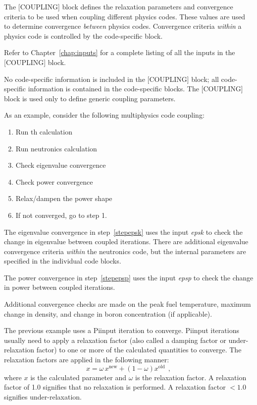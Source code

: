 The [COUPLING] block defines the relaxation parameters and convergence criteria to be
used when coupling different physics codes. These values are used to determine
convergence {\it between} physics codes. Convergence criteria {\it within} a physics
code is controlled by the code-specific block.

Refer to Chapter~\ref{chap:inputs} for a complete listing of all the inputs in the [COUPLING] block.

No code-specific information is included in the [COUPLING] block; all code-specific information
is contained in the code-specific blocks. The [COUPLING] block is used only to define
generic coupling parameters.

As an example, consider the following multiphysics code coupling:
\begin{enumerate}
  \item  Run \ac{th} calculation
  \item  Run neutronics calculation
  \item  Check eigenvalue convergence \label{stepepsk}
  \item  Check power convergence \label{stepepsp}
  \item  Relax/dampen the power shape
  \item  If not converged, go to step 1.
\end{enumerate}
The eigenvalue convergence in step~\ref{stepepsk} uses the input {\it epsk} to check
the change in eigenvalue between coupled iterations.
There are additional eigenvalue convergence criteria {\it within} the neutronics
code, but the internal parameters are specified in the individual code blocks.

The power convergence in step~\ref{stepepsp} uses the input {\it epsp} to check
the change in power between coupled iterations.

Additional convergence checks are made on the peak fuel temperature, maximum change in density,
and change in boron concentration (if applicable).

The previous example uses a Piinput iteration to converge. Piinput iterations usually
need to apply a relaxation factor (also called a damping factor or under-relaxation factor) to
one or more of the calculated quantities to converge.
The relaxation factors are applied in the following manner:
\begin{equation}
  x = \omega \, x^{\mbox{new}} + (1 - \omega) x^{\mbox{old}}~~,
\end{equation}
where $x$ is the calculated parameter and $\omega$ is the relaxation factor.
A relaxation factor of 1.0 signifies that no relaxation is performed.
A relaxation factor $< 1.0$ signifies under-relaxation.

